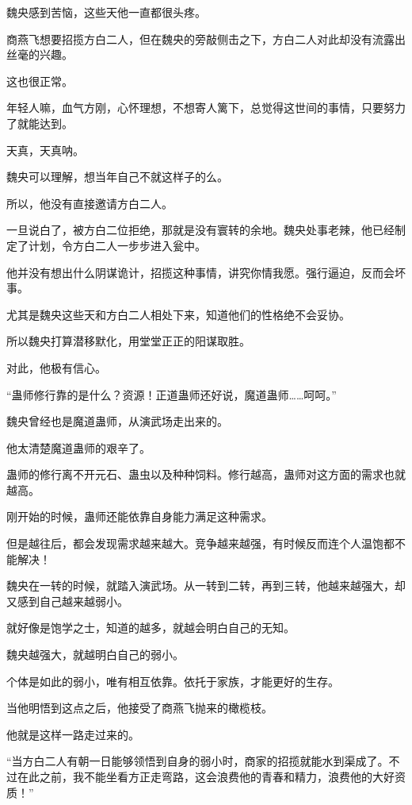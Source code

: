 
\begin{this_body}



魏央感到苦恼，这些天他一直都很头疼。

商燕飞想要招揽方白二人，但在魏央的旁敲侧击之下，方白二人对此却没有流露出丝毫的兴趣。

这也很正常。

年轻人嘛，血气方刚，心怀理想，不想寄人篱下，总觉得这世间的事情，只要努力了就能达到。

天真，天真呐。

魏央可以理解，想当年自己不就这样子的么。

所以，他没有直接邀请方白二人。

一旦说白了，被方白二位拒绝，那就是没有寰转的余地。魏央处事老辣，他已经制定了计划，令方白二人一步步进入瓮中。

他并没有想出什么阴谋诡计，招揽这种事情，讲究你情我愿。强行逼迫，反而会坏事。

尤其是魏央这些天和方白二人相处下来，知道他们的性格绝不会妥协。

所以魏央打算潜移默化，用堂堂正正的阳谋取胜。

对此，他极有信心。

“蛊师修行靠的是什么？资源！正道蛊师还好说，魔道蛊师……呵呵。”

魏央曾经也是魔道蛊师，从演武场走出来的。

他太清楚魔道蛊师的艰辛了。

蛊师的修行离不开元石、蛊虫以及种种饲料。修行越高，蛊师对这方面的需求也就越高。

刚开始的时候，蛊师还能依靠自身能力满足这种需求。

但是越往后，都会发现需求越来越大。竞争越来越强，有时候反而连个人温饱都不能解决！

魏央在一转的时候，就踏入演武场。从一转到二转，再到三转，他越来越强大，却又感到自己越来越弱小。

就好像是饱学之士，知道的越多，就越会明白自己的无知。

魏央越强大，就越明白自己的弱小。

个体是如此的弱小，唯有相互依靠。依托于家族，才能更好的生存。

当他明悟到这点之后，他接受了商燕飞抛来的橄榄枝。

他就是这样一路走过来的。

“当方白二人有朝一日能够领悟到自身的弱小时，商家的招揽就能水到渠成了。不过在此之前，我不能坐看方正走弯路，这会浪费他的青春和精力，浪费他的大好资质！”


\end{this_body}
